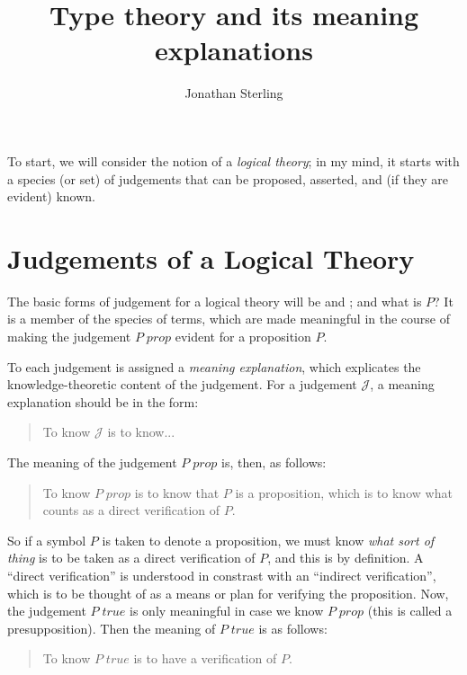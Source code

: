 \documentclass{amsart}
\theoremstyle{definition}
\theoremstyle{remark}
\numberwithin{equation}{section}
\newcommand\isprop[1]{\ensuremath{#1\;\mathit{prop}}}
\newcommand\istrue[1]{\ensuremath{#1\;\mathit{true}}}
\begin{document}
\title{Type theory and its meaning explanations}
\author{Jonathan Sterling}

\maketitle

\onehalfspacing

To start, we will consider the notion of a \emph{logical theory}; in my mind,
it starts with a species (or set) of judgements that can be proposed, asserted,
and (if they are evident) known.

\section{Judgements of a Logical Theory}

The basic forms of judgement for a logical theory will be \framebox{\isprop{P}} and
\framebox{\istrue{P}}; and what is $P$? It is a member of the species of terms,
which are made meaningful in the course of making the judgement
$\isprop{P}$ evident for a proposition $P$.

To each judgement is assigned a \emph{meaning explanation}, which explicates
the knowledge-theoretic content of the judgement. For a judgement
$\mathcal{J}$, a meaning explanation should be in the form:
\begin{quote}
  To know $\mathcal{J}$ is to know...
\end{quote}

The meaning of the judgement \isprop{P} is, then, as follows:
\begin{quote}
  To know \isprop{P} is to know that $P$ is a proposition, which is to know
  what counts as a direct verification of $P$.
\end{quote}

So if a symbol $P$ is taken to denote a proposition, we must know \emph{what
sort of thing} is to be taken as a direct verification of $P$, and this is by
definition. A ``direct verification'' is understood in constrast with an
``indirect verification'', which is to be thought of as a means or plan for
verifying the proposition. Now, the judgement \istrue{P} is only meaningful in
case we know \isprop{P} (this is called a presupposition). Then the meaning of
\istrue{P} is as follows:
\begin{quote}
  To know \istrue{P} is to have a verification of $P$.
\end{quote}
\end{document}
